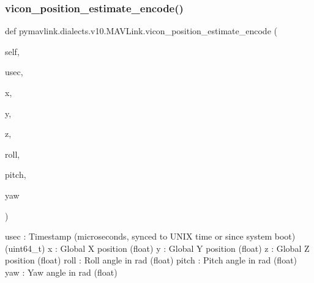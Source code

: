 \begin{DoxyVerb}
\begin{DoxyVerb}
\begin{DoxyVerb}
\begin{DoxyVerb}
\begin{DoxyVerb}
\begin{DoxyVerb}
\begin{DoxyVerb}
\begin{DoxyVerb}
\begin{DoxyVerb}
\begin{DoxyVerb}
\subsubsection{\texorpdfstring{vicon\+\_\+position\+\_\+estimate\+\_\+encode()}{vicon\_position\_estimate\_encode()}}
{\footnotesize\ttfamily def pymavlink.\+dialects.\+v10.\+M\+A\+V\+Link.\+vicon\+\_\+position\+\_\+estimate\+\_\+encode (\begin{DoxyParamCaption}\item[{}]{self,  }\item[{}]{usec,  }\item[{}]{x,  }\item[{}]{y,  }\item[{}]{z,  }\item[{}]{roll,  }\item[{}]{pitch,  }\item[{}]{yaw }\end{DoxyParamCaption})}

\begin{DoxyVerb}usec                      : Timestamp (microseconds, synced to UNIX time or since system boot) (uint64_t)
x                         : Global X position (float)
y                         : Global Y position (float)
z                         : Global Z position (float)
roll                      : Roll angle in rad (float)
pitch                     : Pitch angle in rad (float)
yaw                       : Yaw angle in rad (float)\end{DoxyVerb}
 \mbox{\label{classpymavlink_1_1dialects_1_1v10_1_1MAVLink_ad44cd1b83776b5de6b43142b632bb581}} 

\end{DoxyVerb}
\end{DoxyVerb}
\end{DoxyVerb}
\end{DoxyVerb}
\end{DoxyVerb}
\end{DoxyVerb}
\end{DoxyVerb}
\end{DoxyVerb}
\end{DoxyVerb}
\end{DoxyVerb}
